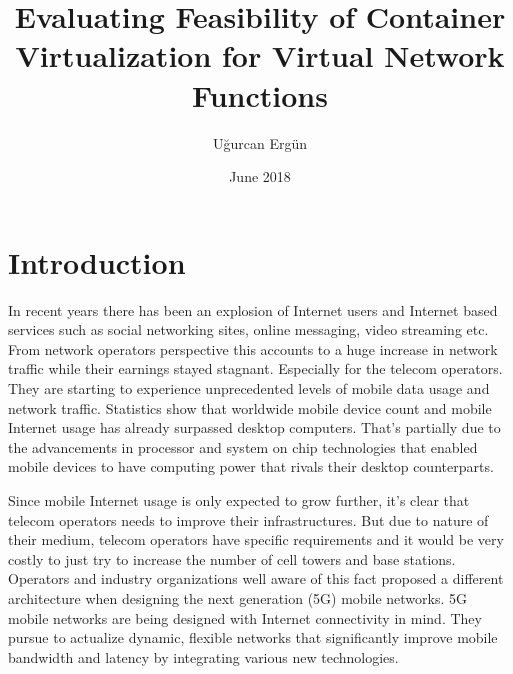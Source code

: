 \documentclass[12pt,oneandhalf,chaparabic,ceng,ms,eng,oneside,pntc]{gsufbe}
\author{Uğurcan Ergün}
\title{Evaluating Feasibility of Container Virtualization for Virtual Network Functions}
\date{June 2018}
\begin{document}
\addtolength{\textheight}{1.5cm}
\newlength\myindent
\setlength\myindent{6em}
\newcommand\bindent{%
  \begingroup
  \setlength{\itemindent}{\myindent}
  \addtolength{\algorithmicindent}{\myindent}
}
\newcommand\eindent{\endgroup}
\begin{preliminaries}

\end{preliminaries}
%
%
%
\newtheorem{thm}{Definition}[chapter]
\renewcommand{\thethm}{\arabic{chapter}.\arabic{thm}}
\newtheorem{prp}{Proposition}[chapter]
\renewcommand{\theprp}{\arabic{chapter}.\arabic{prp}}
\newenvironment{prf}{\noindent{\bf Proof}}{$\hfill \Box$ \vspace{10pt}}

\chapter{Introduction}
In recent years there has been an explosion of Internet users and Internet based services such as
social networking sites, online messaging, video streaming etc.  From network operators perspective this
accounts to a huge increase in network traffic while their earnings stayed stagnant.  Especially for the
telecom operators.  They are starting to experience unprecedented levels of mobile data usage and
network traffic.  Statistics show that worldwide mobile device count and mobile Internet usage has 
already surpassed desktop computers.  That's partially due to the advancements in processor and system
on chip technologies that enabled mobile devices to have computing power that rivals their desktop
counterparts. 

Since mobile Internet usage is only expected to grow further, it's clear that telecom operators needs
to improve their infrastructures.  But due to nature of their medium, telecom operators have specific
requirements and it would be very costly to just try to increase the number of cell towers and base
stations.  Operators and industry organizations well aware of this fact proposed a different
architecture when designing the next generation (5G) mobile networks.  5G mobile networks are being
designed with Internet connectivity in mind.  They pursue to actualize dynamic, flexible networks that
significantly improve mobile bandwidth and latency by integrating various new technologies.
\end{document}
